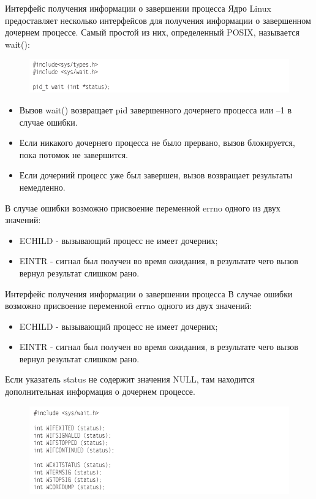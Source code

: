 \documentclass{beamer}
\begin{document}
\begin{frame}{Интерфейс получения информации о завершении процесса}
Ядро Linux предоставляет несколько интерфейсов для получения информации
о завершенном дочернем процессе. Самый простой из них, определенный POSIX,
называется wait(): 
\begin{figure}[h]
\centering
\includegraphics[scale=0.5]{images/lec07-pic12.png}
\end{figure}
\begin{itemize}
\item Вызов wait() возвращает pid завершенного дочернего процесса или –1 в случае
ошибки. 
\item Если никакого дочернего процесса не было прервано, вызов блокируется,
пока потомок не завершится. 
\item Если дочерний процесс уже был завершен, вызов возвращает результаты немедленно.
\end{itemize}
В случае ошибки возможно присвоение переменной errno одного из двух значений:
\begin{itemize}
\item ECHILD - вызывающий процесс не имеет дочерних;
\item EINTR - сигнал был получен во время ожидания, в результате чего вызов вернул
результат слишком рано.
\end{itemize}
\end{frame}

\begin{frame}{Интерфейс получения информации о завершении процесса}
В случае ошибки возможно присвоение переменной errno одного из двух значений:
\begin{itemize}
\item ECHILD - вызывающий процесс не имеет дочерних;
\item EINTR - сигнал был получен во время ожидания, в результате чего вызов вернул
результат слишком рано.
\end{itemize}
Если указатель status не содержит значения NULL, там находится дополнительная
информация о дочернем процессе. 
\begin{figure}[h]
\centering
\includegraphics[scale=0.5]{images/lec07-pic13.png}
\end{figure}
\end{frame}
\end{document}
